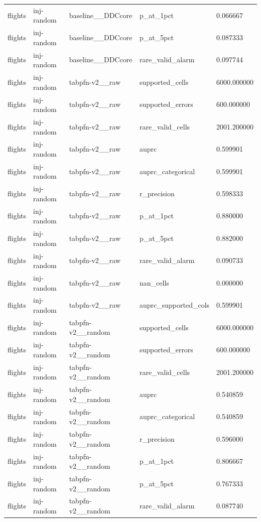 \begin{tabular}{lllll}
flights & inj-random & baseline\_\_DDCcore & p\_at\_1pct & 0.066667 \\
flights & inj-random & baseline\_\_DDCcore & p\_at\_5pct & 0.087333 \\
flights & inj-random & baseline\_\_DDCcore & rare\_valid\_alarm & 0.097744 \\
flights & inj-random & tabpfn-v2\_\_raw & supported\_cells & 6000.000000 \\
flights & inj-random & tabpfn-v2\_\_raw & supported\_errors & 600.000000 \\
flights & inj-random & tabpfn-v2\_\_raw & rare\_valid\_cells & 2001.200000 \\
flights & inj-random & tabpfn-v2\_\_raw & auprc & 0.599901 \\
flights & inj-random & tabpfn-v2\_\_raw & auprc\_categorical & 0.599901 \\
flights & inj-random & tabpfn-v2\_\_raw & r\_precision & 0.598333 \\
flights & inj-random & tabpfn-v2\_\_raw & p\_at\_1pct & 0.880000 \\
flights & inj-random & tabpfn-v2\_\_raw & p\_at\_5pct & 0.882000 \\
flights & inj-random & tabpfn-v2\_\_raw & rare\_valid\_alarm & 0.090733 \\
flights & inj-random & tabpfn-v2\_\_raw & nan\_cells & 0.000000 \\
flights & inj-random & tabpfn-v2\_\_raw & auprc\_supported\_cols & 0.599901 \\
flights & inj-random & tabpfn-v2\_\_random & supported\_cells & 6000.000000 \\
flights & inj-random & tabpfn-v2\_\_random & supported\_errors & 600.000000 \\
flights & inj-random & tabpfn-v2\_\_random & rare\_valid\_cells & 2001.200000 \\
flights & inj-random & tabpfn-v2\_\_random & auprc & 0.540859 \\
flights & inj-random & tabpfn-v2\_\_random & auprc\_categorical & 0.540859 \\
flights & inj-random & tabpfn-v2\_\_random & r\_precision & 0.596000 \\
flights & inj-random & tabpfn-v2\_\_random & p\_at\_1pct & 0.806667 \\
flights & inj-random & tabpfn-v2\_\_random & p\_at\_5pct & 0.767333 \\
flights & inj-random & tabpfn-v2\_\_random & rare\_valid\_alarm & 0.087740 \\

\end{tabular}
